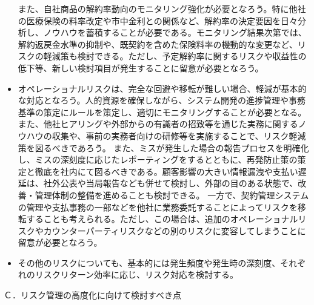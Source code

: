 \documentclass[report,gutter=10mm,fore-edge=10mm,uplatex,dvipdfmx]{jlreq}
\begin{document}
\begin{itemize}
また、自社商品の解約率動向のモニタリング強化が必要となろう。特に他社の医療保険の料率改定や市中金利との関係など、解約率の決定要因を日々分析し、ノウハウを蓄積することが必要である。モニタリング結果次第では、解約返戻金水準の抑制や、既契約を含めた保険料率の機動的な変更など、リスクの軽減策も検討できる。ただし、予定解約率に関するリスクや収益性の低下等、新しい検討項目が発生することに留意が必要となろう。
\item[] オペレーショナルリスクは、完全な回避や移転が難しい場合、軽減が基本的な対応となろう。人的資源を確保しながら、システム開発の進捗管理や事務基準の策定にルールを策定し、適切にモニタリングすることが必要となる。また、他社ヒアリングや外部からの有識者の招致等を通じた実務に関するノウハウの収集や、事前の実務者向けの研修等を実施することで、リスク軽減策を図るべきであろう。
また、ミスが発生した場合の報告プロセスを明確化し、ミスの深刻度に応じたレポーティングをするとともに、再発防止策の策定と徹底を社内にて図るべきである。顧客影響の大きい情報漏洩や支払い遅延は、社外公表や当局報告なども併せて検討し、外部の目のある状態で、改善・管理体制の整備を進めることも検討できる。
一方で、契約管理システムの管理や支払事務の一部などを他社に業務委託することによってリスクを移転することも考えられる。ただし、この場合は、追加のオペレーショナルリスクやカウンターパーティリスクなどの別のリスクに変容してしまうことに留意が必要となろう。
\item[] その他のリスクについても、基本的には発生頻度や発生時の深刻度、それぞれのリスクリターン効率に応じ、リスク対応を検討する。
\end{itemize}

Ｃ．リスク管理の高度化に向けて検討すべき点
\end{document}
